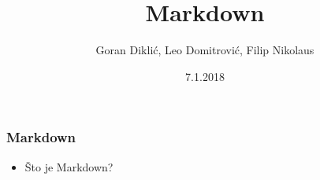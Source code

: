 \documentclass{beamer}
\title{Markdown}
\author{Goran Diklić, Leo Domitrović, Filip Nikolaus}
\date{7.1.2018}
\begin{document}
\maketitle

\newpage

\begin{frame}
\frametitle{Markdown}

\begin{itemize}
\item Što je Markdown?
\end{itemize}
\end{frame}
\end{document}
